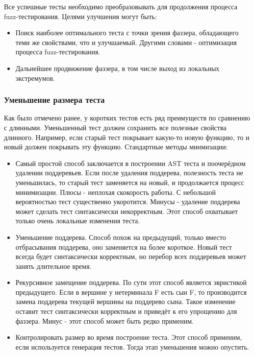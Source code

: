 \documentclass[a4paper]{article}
\begin{document}
Все успешные тесты необходимо преобразовывать для продолжения процесса fuzz-тестирования. Целями улучшения могут быть: 
\begin{itemize}
\item Поиск наиболее оптимального теста с точки зрения фаззера, обладающего теми же свойствами, что и улучшаемый. Другими словами - оптимизация процесса fuzz-тестирования.
\item Дальнейшее продвижение фаззера, в том числе выход из локальных экстремумов.
\end{itemize}

\subsubsection{Уменьшение размера теста}
\indent

Как было отмечено ранее, у коротких тестов есть ряд преимуществ по сравнению с длинными. Уменьшенный тест должен сохранить все полезные свойства длинного. Например, если старый тест покрывает какую-то новую функцию, то и новый должен покрывать эту функцию. Стандартные методы минмизации:

\begin{itemize}
\item Самый простой способ заключается в построении AST теста и поочерёдном удалении поддеревьев. Если после удаления поддерева, полезность теста не уменьшилась, то старый тест заменяется на новый, и продолжается процесс минимизации. Плюсы - неплохая скокорость работы. С небольшой вероятностью тест  существенно укоротится. Минусы - удаление поддерева может сделать тест синтаксически некорректным. Этот способ охватывает только очень локальные изменения теста.
\item Уменьшение поддерева. Способ похож на предыдущий, только вместо отбрасывания поддерева, оно заменяется на более короткое. Новый тест всегда будет синтаксически корректным, но перебор всех поддеревьев может занять длительное время.
\item Рекурсивное замещение поддерева. По сути этот способ является эвристикой предыдущего. Если в вершине у нетерминала F есть сын F, то производится замена поддерева текущей вершины на поддерево сына. Такое изменение оставит тест синтаксически корректным и приведёт к его упрощению для фаззера. Минус - этот способ может быть редко применим.
\item Контролировать размер во время построение теста. Этот способ применим, если используется генерация тестов. Тогда этап уменьшения можно опустить.
\end{itemize}
\end{document}
